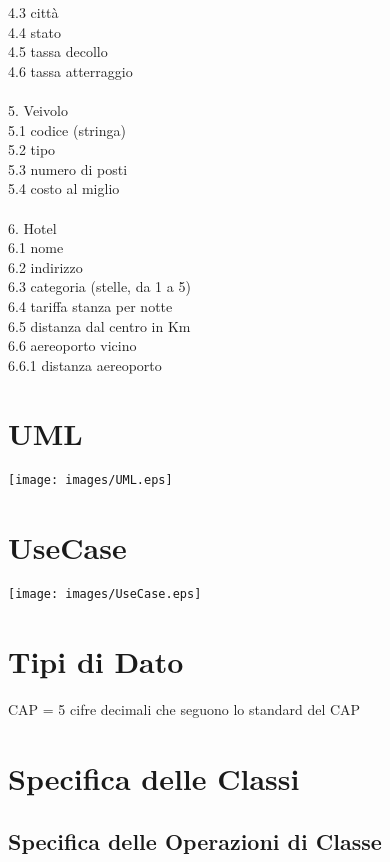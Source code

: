 \documentclass[12pt, letterpaper]{article}
\newcommand{\acc}{\\\hphantom{}\\}
\newcommand{\id}{{\hphantom{ident}}}
\begin{document}
\id 4.3 città \\
\id 4.4 stato \\
\id 4.5 tassa decollo \\ 
\id 4.6 tassa atterraggio \acc 
5. Veivolo \\ 
\id 5.1 codice (stringa) \\
\id 5.2 tipo \\ 
\id 5.3 numero di posti \\ 
\id 5.4 costo al miglio \acc 
6. Hotel\\ 
\id 6.1 nome \\ 
\id 6.2 indirizzo \\ 
\id 6.3 categoria (stelle, da 1 a 5) \\
\id 6.4 tariffa stanza per notte \\ 
\id 6.5 distanza dal centro in Km \\ 
\id 6.6 aereoporto vicino \\ 
\id \id 6.6.1 distanza aereoporto


\newpage 
\section{UML}
\begin{center}
    \texttt{[image: images/UML.eps]}
\end{center}
\newpage 
\section{UseCase}
\begin{center}
    \texttt{[image: images/UseCase.eps]}
\end{center}
\newpage
\section{Tipi di Dato}
CAP = 5 cifre decimali che seguono lo standard del CAP

\newpage 
\section{Specifica delle Classi}
\subsection{Specifica delle Operazioni di Classe}
\end{document}

